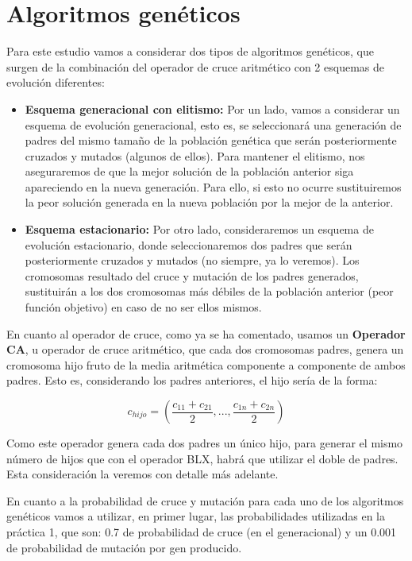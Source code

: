 \documentclass{article}
\begin{document}
\section{Algoritmos genéticos}
Para este estudio vamos a considerar dos tipos de algoritmos genéticos, que surgen de la combinación del operador de cruce aritmético con 2 esquemas de evolución diferentes:
\begin{itemize}
	\item \textbf{Esquema generacional con elitismo: } Por un lado, vamos a considerar un esquema de evolución generacional, esto es, se seleccionará una generación de padres del mismo tamaño de la población genética que serán posteriormente cruzados y mutados (algunos de ellos). Para mantener el elitismo, nos aseguraremos de que la mejor solución de la población anterior siga apareciendo en la nueva generación. Para ello, si esto no ocurre sustituiremos la peor solución generada en la nueva población por la mejor de la anterior.
	\item \textbf{Esquema estacionario: } Por otro lado, consideraremos un esquema de evolución estacionario, donde seleccionaremos dos padres que serán posteriormente cruzados y mutados (no siempre, ya lo veremos). Los cromosomas resultado del cruce y mutación de los padres generados, sustituirán a los dos cromosomas más débiles de la población anterior (peor función objetivo) en caso de no ser ellos mismos. 
\end{itemize}

En cuanto al operador de cruce, como ya se ha comentado, usamos un \textbf{Operador CA}, u operador de cruce aritmético, que cada dos cromosomas padres, genera un cromosoma hijo fruto de la media aritmética componente a componente de ambos padres. Esto es, considerando los padres anteriores, el hijo sería de la forma:

\[
c_{hijo} = ( \frac{c_{11} + c_{21}}{2}, ..., \frac{c_{1n} + c_{2n}}{2})
\]

Como este operador genera cada dos padres un único hijo, para generar el mismo número de hijos que con el operador BLX, habrá que utilizar el doble de padres. Esta consideración la veremos con detalle más adelante.

En cuanto a la probabilidad de cruce y mutación para cada uno de los algoritmos genéticos vamos a utilizar, en primer lugar, las probabilidades utilizadas en la práctica 1, que son: 0.7 de probabilidad de cruce (en el generacional) y un 0.001 de probabilidad de mutación por gen producido.
\end{document}
